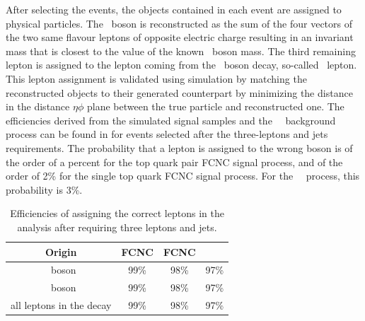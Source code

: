 %
After selecting the events,  the objects contained in each event are assigned to physical particles.  The \PZ\ boson is reconstructed as the sum of the four vectors of the two same flavour leptons of opposite electric charge resulting in an invariant mass that is closest to the value of the known \PZ\ boson mass. The third remaining lepton is assigned to the lepton coming from the \PW\ boson decay, so-called \PW\ lepton. This lepton assignment is  validated using simulation by matching the reconstructed objects to their generated counterpart by minimizing  the distance in the distance $\eta\phi$ plane between the true particle and reconstructed one. The efficiencies derived from the simulated signal samples and the \SM\ \tZq\ background process can be found in  for events selected after the three-leptons and jets requirements. The probability that a lepton is assigned to the wrong boson is of the order of a percent for the top quark pair FCNC signal process, and of the order of 2\% for the single top quark FCNC signal process. For the \SM\ \tZq\ process, this probability is 3\%.
\begin{table}[htbp]
	\centering
	\caption{Efficiencies of assigning the correct leptons in the analysis after requiring three leptons and jets.}
	\begin{tabular}{cccc}
		\toprule 
		Origin & FCNC \tZq  & FCNC \tZ & \SM\ \tZq \\ 
		\midrule
		\PW\ boson & 99\% & 98\% & 97\% \\ 
	
		\PZ\ boson  & 99\% & 98\% & 97\% \B\\ 
		 \hdashline
		all leptons in the decay & 99\% & 98\% & 97\% \T \\ 
		\bottomrule
	\end{tabular} 
	\label{tab:matching}
\end{table}

